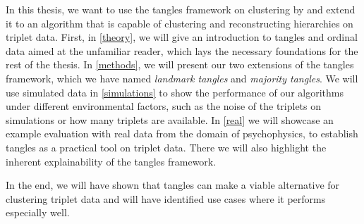 In this thesis, we want to use the tangles framework on clustering by \cite{klepperClusteringTanglesAlgorithmic2021} and extend it to an algorithm that is capable of clustering and reconstructing
hierarchies on triplet data. First, in \autoref{theory}, we will give an introduction to tangles and ordinal data aimed at the unfamiliar reader, which lays
the necessary foundations for the rest of the thesis. 
In \autoref{methods}, we will present our two extensions of the tangles framework, which we have named \textit{landmark tangles} and \textit{majority tangles}.
We will use simulated data in \autoref{simulations} to show the performance of our algorithms under different environmental factors, such as the noise of the triplets on simulations or how many triplets are available. 
In \autoref{real} we will showcase an example evaluation with real data from the domain of psychophysics, to establish tangles as a practical tool on triplet data.
There we will also highlight the inherent explainability of the tangles framework. 

In the end, we will have shown that tangles can make a viable alternative for clustering triplet data and will have identified use cases where it performs especially well.
